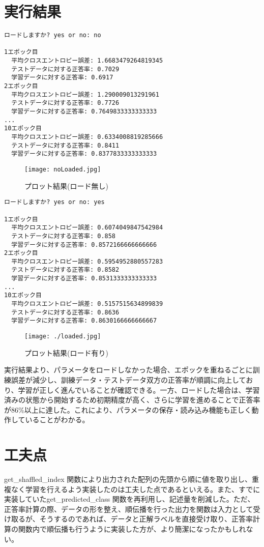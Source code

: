 \documentclass[11px,a4,dvipdfmx]{jsarticle}
\begin{document}
\section{実行結果}
\begin{verbatim}
ロードしますか? yes or no: no

1エポック目
  平均クロスエントロピー誤差: 1.6683479264819345
  テストデータに対する正答率: 0.7029
  学習データに対する正答率: 0.6917
2エポック目
  平均クロスエントロピー誤差: 1.290009013291961
  テストデータに対する正答率: 0.7726
  学習データに対する正答率: 0.7649833333333333
...
10エポック目
  平均クロスエントロピー誤差: 0.6334008819285666
  テストデータに対する正答率: 0.8411
  学習データに対する正答率: 0.8377833333333333
\end{verbatim}
 \begin{figure}[H]
		      \begin{center}
			      \texttt{[image: noLoaded.jpg]}
			      \caption{プロット結果(ロード無し)}
		      \end{center}
\end{figure}
\begin{verbatim}
ロードしますか? yes or no: yes

1エポック目
  平均クロスエントロピー誤差: 0.6074049847542984
  テストデータに対する正答率: 0.858
  学習データに対する正答率: 0.8572166666666666
2エポック目
  平均クロスエントロピー誤差: 0.5954952880557283
  テストデータに対する正答率: 0.8582
  学習データに対する正答率: 0.8531333333333333
...
10エポック目
  平均クロスエントロピー誤差: 0.5157515634899839
  テストデータに対する正答率: 0.8636
  学習データに対する正答率: 0.8630166666666667
\end{verbatim}
\begin{figure}[H]
		      \begin{center}
			      \texttt{[image: ./loaded.jpg]}
			      \caption{プロット結果(ロード有り)}
		      \end{center}
\end{figure}
実行結果より、パラメータをロードしなかった場合、エポックを重ねるごとに訓練誤差が減少し、訓練データ・テストデータ双方の正答率が順調に向上しており、学習が正しく進んでいることが確認できる。一方、ロードした場合は、学習済みの状態から開始するため初期精度が高く、さらに学習を進めることで正答率が86\%以上に達した。これにより、パラメータの保存・読み込み機能も正しく動作していることがわかる。


\section{工夫点}
get\_shaffled\_index 関数により出力された配列の先頭から順に値を取り出し、重複なく学習を行えるよう実装したのは工夫した点であるといえる。また、すでに実装していたget\_predicted\_class 関数を再利用し、記述量を削減した。ただ、正答率計算の際、データの形を整え、順伝播を行った出力を関数は入力として受け取るが、そうするのであれば、データと正解ラベルを直接受け取り、正答率計算の関数内で順伝播も行うように実装した方が、より簡潔になったかもしれない。
\end{document}
